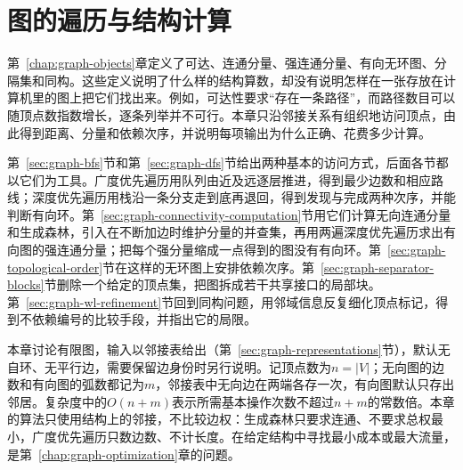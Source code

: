 \chapter{图的遍历与结构计算}
\label{chap:graph-traversal}

第~\ref{chap:graph-objects}章定义了可达、连通分量、强连通分量、有向无环图、分隔集和同构。这些定义说明了什么样的结构算数，却没有说明怎样在一张存放在计算机里的图上把它们找出来。例如，可达性要求“存在一条路径”，而路径数目可以随顶点数指数增长，逐条列举并不可行。本章只沿邻接关系有组织地访问顶点，由此得到距离、分量和依赖次序，并说明每项输出为什么正确、花费多少计算。

第~\ref{sec:graph-bfs}节和第~\ref{sec:graph-dfs}节给出两种基本的访问方式，后面各节都以它们为工具。广度优先遍历用队列由近及远逐层推进，得到最少边数和相应路线；深度优先遍历用栈沿一条分支走到底再退回，得到发现与完成两种次序，并能判断有向环。第~\ref{sec:graph-connectivity-computation}节用它们计算无向连通分量和生成森林，引入在不断加边时维护分量的并查集，再用两遍深度优先遍历求出有向图的强连通分量；把每个强分量缩成一点得到的图没有有向环。第~\ref{sec:graph-topological-order}节在这样的无环图上安排依赖次序。第~\ref{sec:graph-separator-blocks}节删除一个给定的顶点集，把图拆成若干共享接口的局部块。第~\ref{sec:graph-wl-refinement}节回到同构问题，用邻域信息反复细化顶点标记，得到不依赖编号的比较手段，并指出它的局限。

本章讨论有限图，输入以邻接表给出（第~\ref{sec:graph-representations}节），默认无自环、无平行边，需要保留边身份时另行说明。记顶点数为$n=|V|$；无向图的边数和有向图的弧数都记为$m$，邻接表中无向边在两端各存一次，有向图默认只存出邻居。复杂度中的$O(n+m)$表示所需基本操作次数不超过$n+m$的常数倍。本章的算法只使用结构上的邻接，不比较边权：生成森林只要求连通、不要求总权最小，广度优先遍历只数边数、不计长度。在给定结构中寻找最小成本或最大流量，是第~\ref{chap:graph-optimization}章的问题。









